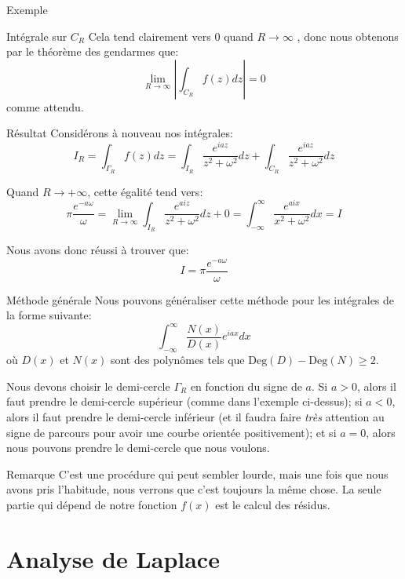 \documentclass[a4paper]{article}
\begin{document}
\begin{parag}{Exemple}
\begin{subparag}{Intégrale sur $C_R$}
        Cela tend clairement vers $0$ quand $R \to \infty$ , donc nous obtenons par le théorème des gendarmes que: 
        \[\lim_{R \to \infty} \left|\int_{C_R} f\left(z\right) dz\right| = 0\]
        comme attendu.
    \end{subparag}

    \begin{subparag}{Résultat}
        Considérons à nouveau nos intégrales:
        \[I_R = \int_{\Gamma_R} f\left(z\right)dz = \int_{I_R} \frac{e^{i a z}}{z^2 + \omega^2} dz + \int_{C_R} \frac{e^{i a z}}{z^2 + \omega^2} dz\]

        Quand $R \to +\infty$, cette égalité tend vers: 
        \[\pi \frac{e^{-a \omega}}{\omega} = \lim_{R \to \infty} \int_{I_R} \frac{e^{a i z}}{z^2 + \omega^2} dz + 0 = \int_{-\infty}^{\infty} \frac{e^{ai x}}{x^2 + \omega^2} dx = I\]

        Nous avons donc réussi à trouver que: 
        \[I = \pi \frac{e^{-a \omega}}{\omega}\]
    \end{subparag}
\end{parag}
 
\begin{parag}{Méthode générale}
    Nous pouvons généraliser cette méthode pour les intégrales de la forme suivante: 
    \[\int_{-\infty}^{\infty} \frac{N\left(x\right)}{D\left(x\right)} e^{i a x} dx\]
    où $D\left(x\right)$ et $N\left(x\right)$ sont des polynômes tels que $\text{Deg}\left(D\right) - \text{Deg}\left(N\right) \geq 2$. 

    Nous devons choisir le demi-cercle $\Gamma_R$ en fonction du signe de $a$. Si $a > 0$, alors il faut prendre le demi-cercle supérieur (comme dans l'exemple ci-dessus); si $a < 0$, alors il faut prendre le demi-cercle inférieur (et il faudra faire \textit{très} attention au signe de parcours pour avoir une courbe orientée positivement); et si $a = 0$, alors nous pouvons prendre le demi-cercle que nous voulons.

    \begin{subparag}{Remarque}
        C'est une procédure qui peut sembler lourde, mais une fois que nous avons pris l'habitude, nous verrons que c'est toujours la même chose. La seule partie qui dépend de notre fonction $f\left(x\right)$ est le calcul des résidus.
    \end{subparag}
\end{parag}

\section{Analyse de Laplace}
\end{document}
